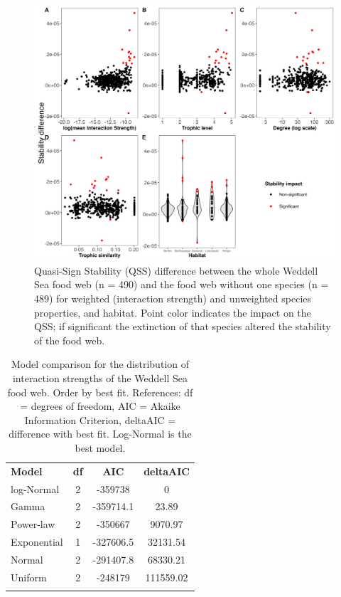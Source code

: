\documentclass[gc, manuscript]{copernicus}
\begin{document}
\clearpage

\begin{figure}
\includegraphics[width=12cm]{Fig.5_QSSDif} \caption{Quasi-Sign Stability (QSS) difference between the whole Weddell Sea food web (n = 490) and the food web without one species (n = 489) for weighted (interaction strength) and unweighted species properties, and habitat. Point color indicates the impact on the QSS; if significant the extinction of that species altered the stability of the food web.}\label{fig:unnamed-chunk-5}
\end{figure}

\clearpage

\begin{table}[t]
\caption{Model comparison for the distribution of interaction strengths of the Weddell Sea food web. Order by best fit. References: df = degrees of freedom, AIC = Akaike Information Criterion, deltaAIC = difference with best fit. Log-Normal is the best model.}
\begin{tabular}{l c c c}
\tophline

\textbf{Model} & \textbf{df} & \textbf{AIC} & \textbf{deltaAIC} \\
\middlehline
log-Normal & 2 & -359738 & 0 \\
\middlehline
Gamma & 2 & -359714.1 & 23.89 \\
\middlehline
Power-law & 2 & -350667 & 9070.97 \\
\middlehline
Exponential & 1 & -327606.5 & 32131.54 \\
\middlehline
Normal & 2 & -291407.8 & 68330.21 \\
\middlehline
Uniform & 2 & -248179 & 111559.02 \\

\bottomhline
\end{tabular}
\end{table}
\end{document}
